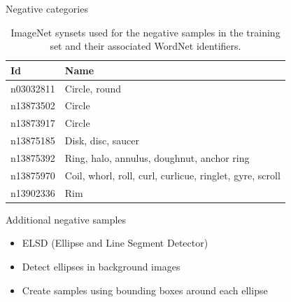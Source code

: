 \begin{frame}{Negative categories}
\begin{table}[t]
	\centering
	\caption{ImageNet synsets used for the negative samples in the training set and their associated WordNet identifiers.}
		\label{tab:negative_samples}
	\begin{tabularx}{1.0\columnwidth}{@{}lX@{}}
	\toprule
	\textbf{Id} & \textbf{Name} \\
	\midrule
	n03032811 & Circle, round \\
	n13873502 & Circle \\
	n13873917 & Circle \\
	n13875185 & Disk, disc, saucer \\
	n13875392 & Ring, halo, annulus, doughnut, anchor ring \\
	n13875970 & Coil, whorl, roll, curl, curlicue, ringlet, gyre, scroll \\
	n13902336 & Rim \\
	\bottomrule
	\end{tabularx}
\end{table}
\end{frame}

\begin{frame}{Additional negative samples}
	\begin{itemize}
			\item ELSD (Ellipse and Line Segment Detector) \citep{Patraucean:2012jf}
			\item Detect ellipses in background images
			\item Create samples using bounding boxes around each ellipse
	\end{itemize}
\end{frame}


\newcommand{\samplefigurewidth}{0.45\textwidth}
\newcommand{\samplewidth}{0.14\textwidth}
\newcommand{\sampleheight}{0.14\textwidth}
\newcommand{\includesample}[1]{\hspace{0.1cm}\texttt{[image: images/training/\#1]}}

